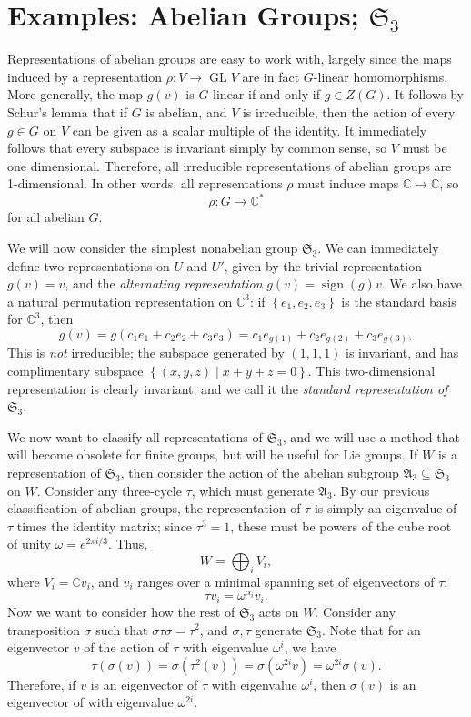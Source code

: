 \section{Examples: Abelian Groups; $\mathfrak{S} _3$}
Representations of abelian groups are easy to work with, largely since the maps induced by a representation $\rho : V \to \operatorname{GL} V$ are in fact $G$-linear homomorphisms. More generally, the map $g(v)$ is $G$-linear if and only if $g\in Z(G)$. It follows by Schur's lemma that if $G$ is abelian, and $V$ is irreducible, then the action of every $g\in G$ on $V$ can be given as a scalar multiple of the identity. It immediately follows that every subspace is invariant simply by common sense, so $V$ must be one dimensional. Therefore, all irreducible representations of abelian groups are 1-dimensional. In other words, all representations $\rho $ must induce maps $\mathbb{C} \to \mathbb{C} $, so
\[
	\rho : G \to \mathbb{C} ^*
\]
for all abelian $G$.

We will now consider the simplest nonabelian group $\mathfrak{S} _3$. We can immediately define two representations on $U$ and $U'$, given by the trivial representation $g(v)=v$, and the \emph{alternating representation} $g(v)=\operatorname{sign} (g)v$. We also have a natural permutation representation on $\mathbb{C} ^3$: if $\left\{ e_1,e_2,e_3 \right\} $ is the standard basis for $\mathbb{C} ^3$, then
\[
	g(v)=g\left( c_1e_1+c_2e_2+c_3e_3 \right) =c_1e_{g(1)} +c_2e_{g (2)} +c_3e_{g (3)} ,
\]
This is \emph{not} irreducible; the subspace generated by $(1,1,1)$ is invariant, and has complimentary subspace $\left\{ (x,y,z)\mid x+y+z=0 \right\} $. This two-dimensional representation is clearly invariant, and we call it the \emph{standard representation of} $\mathfrak{S} _3$.

We now want to classify all representations of $\mathfrak{S} _3$, and we will use a method that will become obsolete for finite groups, but will be useful for Lie groups. If $W$ is a representation of $\mathfrak{S} _3$, then consider the action of the abelian subgroup $\mathfrak{A} _3\subseteq \mathfrak{S} _3$ on $W$. Consider any three-cycle $\tau $, which must generate $\mathfrak{A} _3$. By our previous classification of abelian groups, the representation of $\tau $ is simply an eigenvalue of $\tau $ times the identity matrix; since $\tau ^3=1$, these must be powers of the cube root of unity $\omega =e^{2\pi i/3} $. Thus,
\[
	W=\bigoplus_{i} V_i
,\]
where $V_i=\mathbb{C} v_i$, and $v_i$ ranges over a minimal spanning set of eigenvectors of $\tau $:
\[
	\tau v_i=\omega ^{\alpha _i} v_i
.\]
Now we want to consider how the rest of $\mathfrak{S} _3$ acts on $W$. Consider any transposition $\sigma $ such that $\sigma \tau \sigma =\tau ^2$, and $\sigma ,\tau $ generate $\mathfrak{S} _3$. Note that for an eigenvector $v$ of the action of $\tau $ with eigenvalue $\omega ^i$, we have
\[
	\tau (\sigma (v))=\sigma (\tau ^2(v))=\sigma (\omega ^{2i} v)=\omega ^{2i} \sigma (v)
.\]
Therefore, if $v$ is an eigenvector of $\tau $ with eigenvalue $\omega ^i$, then $\sigma (v)$ is an eigenvector of with eigenvalue $\omega ^{2i} $.

